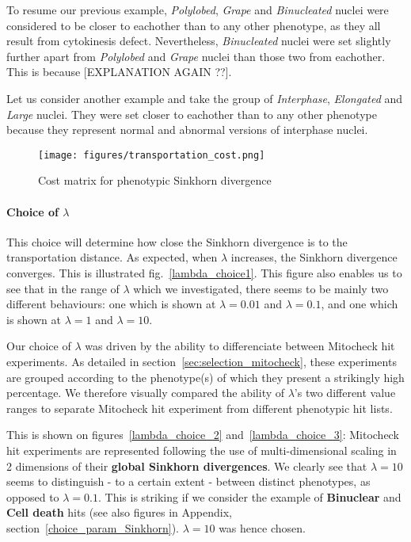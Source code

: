 To resume our previous example, \textit{Polylobed}, \textit{Grape} and \textit{Binucleated} nuclei were considered to be closer to eachother than to any other phenotype, as they all result from cytokinesis defect. Nevertheless, \textit{Binucleated} nuclei were set slightly further apart from \textit{Polylobed} and \textit{Grape} nuclei than those two from eachother. This is because [EXPLANATION AGAIN ??].

Let us consider another example and take the group of \textit{Interphase}, \textit{Elongated} and \textit{Large} nuclei. They were set closer to eachother than to any other phenotype because they represent normal and abnormal versions of interphase nuclei.

\begin{figure*}[ht!]
\centerline{\texttt{[image: figures/transportation\_cost.png]}
}
\caption{Cost matrix for phenotypic Sinkhorn divergence}
\label{cost}
\end{figure*}

\paragraph{Choice of $\lambda$} This choice will determine how close the Sinkhorn divergence is to the transportation distance. As expected, when $\lambda$ increases, the Sinkhorn divergence converges. This is illustrated fig.~\ref{lambda_choice1}. This figure also enables us to see that in the range of $\lambda$ which we investigated, there seems to be mainly two different behaviours: one which is shown at $\lambda=0.01$ and $\lambda=0.1$, and one which is shown at $\lambda=1$ and $\lambda=10$.

Our choice of $\lambda$ was driven by the ability to differenciate between Mitocheck hit experiments. As detailed in section~\ref{sec:selection_mitocheck}, these experiments are grouped according to the phenotype(s) of which they present a strikingly high percentage. We therefore visually compared the ability of $\lambda$'s two different value ranges to separate Mitocheck hit experiment from different phenotypic hit lists. 

This is shown on figures~\ref{lambda_choice_2} and~\ref{lambda_choice_3}: Mitocheck hit experiments are represented following the use of multi-dimensional scaling in 2 dimensions of their \textbf{global Sinkhorn divergences}. We clearly see that $\lambda=10$ seems to distinguish - to a certain extent - between distinct phenotypes, as opposed to $\lambda=0.1$. This is striking if we consider the example of \textbf{Binuclear} and \textbf{Cell death} hits (see also figures in Appendix, section~\ref{choice_param_Sinkhorn}). $\lambda=10$ was hence chosen.

